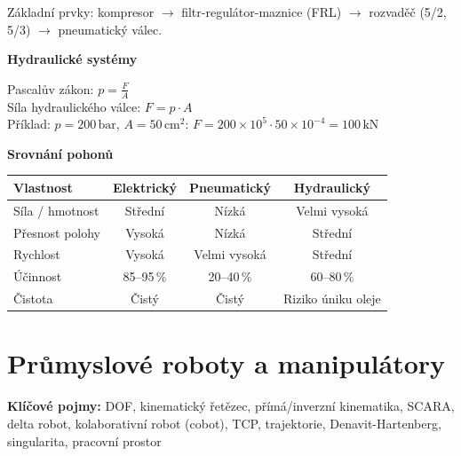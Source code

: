 \documentclass[a4paper,10pt]{article}
\begin{document}
\begin{vysvetlenibox}
Základní prvky: kompresor $\to$ filtr-regulátor-maznice (FRL)
$\to$ rozvaděč (5/2, 5/3) $\to$ pneumatický válec.

\textbf{Hydraulické systémy}

\begin{vzorcebox}
Pascalův zákon: $p = \frac{F}{A}$ \quad [Pa = N/m²]\\
Síla hydraulického válce: $F = p \cdot A$\\
Příklad: $p = 200\,\text{bar}$, $A = 50\,\text{cm}^2$:
$F = 200 \times 10^5 \cdot 50 \times 10^{-4} = 100\,\text{kN}$
\end{vzorcebox}

\textbf{Srovnání pohonů}

\begin{center}
\begin{tabular}{@{} l c c c @{}}
    \toprule
    \textbf{Vlastnost} & \textbf{Elektrický}
                       & \textbf{Pneumatický} & \textbf{Hydraulický} \\
    \midrule
    Síla / hmotnost & Střední & Nízká & Velmi vysoká \\
    Přesnost polohy & Vysoká & Nízká & Střední \\
    Rychlost        & Vysoká & Velmi vysoká & Střední \\
    Účinnost        & 85--95\,\% & 20--40\,\% & 60--80\,\% \\
    Čistota         & Čistý & Čistý & Riziko úniku oleje \\
    \bottomrule
\end{tabular}
\end{center}
\end{vysvetlenibox}

\section{Průmyslové roboty a manipulátory}

\begin{pojmybox}
\textbf{Klíčové pojmy:}
DOF, kinematický řetězec, přímá/inverzní kinematika, SCARA,
delta robot, kolaborativní robot (cobot), TCP, trajektorie,
Denavit-Hartenberg, singularita, pracovní prostor
\end{pojmybox}
\end{document}
